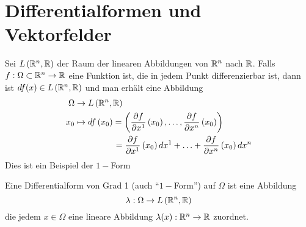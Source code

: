 \section{Differentialformen und Vektorfelder}
Sei $L\left(\mathbb{R}^n,\mathbb{R}\right)$ der Raum der linearen Abbildungen von $\mathbb{R}^n$ nach $\mathbb{R}$. Falls $f:\Omega\subset\mathbb{R}^n\to\mathbb{R}$ eine Funktion ist, die in jedem Punkt differenzierbar ist, dann ist $df(x)\in L\left(\mathbb{R}^n,\mathbb{R}\right)$ und man erhält eine Abbildung
\begin{align*}
\Omega &\to L\left(\R^n,\R\right)\\
x_0 &\mapsto df\left(x_0\right) = \left( {\frac{{\partial f}}{{\partial {x^1}}}\left( {{x_0}} \right), \ldots ,\frac{{\partial f}}{{\partial {x^n}}}\left( {{x_0}} \right)} \right)\\
& \hspace{16mm}=  \frac{{\partial f}}{{\partial {x^1}}}\left( {{x_0}} \right)d{x^1} +  \ldots  + \frac{{\partial f}}{{\partial {x^n}}}\left( {{x_0}} \right)d{x^n}
\end{align*}
Dies ist ein Beispiel der $1-$Form

\begin{definition}{8.26}
Eine Differentialform von Grad 1 (auch ``$1-$Form'') auf $\Omega$ ist eine Abbildung \[\lambda :\Omega\to L\left(\mathbb{R}^n,\mathbb{R}\right)\]
die jedem $x\in\Omega$ eine lineare Abbildung $\lambda(x):\mathbb{R}^{n}\to\mathbb{R}$ zuordnet.
\end{definition}
